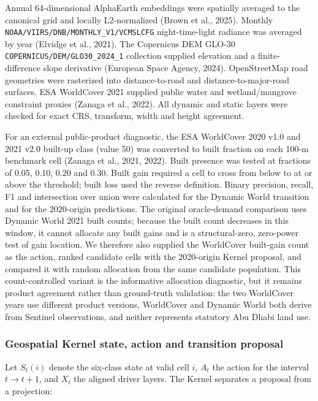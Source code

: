 Annual 64-dimensional AlphaEarth embeddings were spatially averaged to
the canonical grid and locally L2-normalized (Brown et al., 2025).
Monthly \texttt{NOAA/VIIRS/DNB/MONTHLY\_V1/VCMSLCFG} night-time-light
radiance was averaged by year (Elvidge et al., 2021). The Copernicus DEM
GLO-30 \texttt{COPERNICUS/DEM/GLO30\_2024\_1} collection supplied
elevation and a finite-difference slope derivative (European Space
Agency, 2024). OpenStreetMap road geometries were rasterized into
distance-to-road and distance-to-major-road surfaces. ESA WorldCover
2021 supplied public water and wetland/mangrove constraint proxies
(Zanaga et al., 2022). All dynamic and static layers were checked for
exact CRS, transform, width and height agreement.

For an external public-product diagnostic, the ESA WorldCover 2020 v1.0
and 2021 v2.0 built-up class (value 50) was converted to built fraction
on each 100-m benchmark cell (Zanaga et al., 2021, 2022). Built presence
was tested at fractions of 0.05, 0.10, 0.20 and 0.30. Built gain
required a cell to cross from below to at or above the threshold; built
loss used the reverse definition. Binary precision, recall, F1 and
intersection over union were calculated for the Dynamic World transition
and for the 2020-origin predictions. The original oracle-demand
comparison uses Dynamic World 2021 built counts; because the built count
decreases in this window, it cannot allocate any built gains and is a
structural-zero, zero-power test of gain location. We therefore also
supplied the WorldCover built-gain count as the action, ranked candidate
cells with the 2020-origin Kernel proposal, and compared it with random
allocation from the same candidate population. This count-controlled
variant is the informative allocation diagnostic, but it remains product
agreement rather than ground-truth validation: the two WorldCover years
use different product versions, WorldCover and Dynamic World both derive
from Sentinel observations, and neither represents statutory Abu Dhabi
land use.

\subsubsection{Geospatial Kernel state, action and transition
proposal}\label{geospatial-kernel-state-action-and-transition-proposal}

Let \(S_t(i)\) denote the six-class state at valid cell \(i\), \(A_t\)
the action for the interval \(t\rightarrow t+1\), and \(X_t\) the
aligned driver layers. The Kernel separates a proposal from a
projection:

